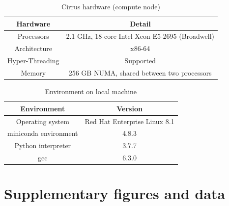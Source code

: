 \begin{table}
    \centering
    \begin{tabular}{|c c|}
        \hline
        Hardware        & Detail                                          \\ [0.5ex]
        \hline\hline
        Processors      & 2.1 GHz, 18-core Intel Xeon E5-2695 (Broadwell) \\
        Architecture    & x86-64                                          \\
        Hyper-Threading & Supported                                       \\
        Memory          & 256 GB NUMA, shared between two processors         \\
        \hline
    \end{tabular}
    \caption{Cirrus hardware (compute node)}
    \label{table:remote_hardware}
\end{table}

\begin{table}[H]
    \centering
    \begin{tabular}{|c c|}
        \hline
        Environment           & Version                      \\ [0.5ex]
        \hline\hline
        Operating system      & Red Hat Enterprise Linux 8.1 \\
        miniconda environment & 4.8.3                        \\
        Python interpreter    & 3.7.7                        \\
        gcc                   & 6.3.0                        \\
        \hline
    \end{tabular}
    \caption{Environment on local machine}
    \label{table:cirrus_soft}
\end{table}


\chapter{Supplementary figures and data}







